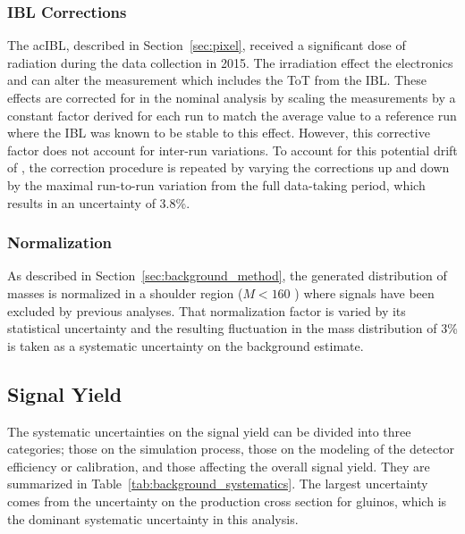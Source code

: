 \subsubsection{\ac{IBL} Corrections}

The ac{IBL}, described in Section~\ref{sec:pixel}, received a significant dose of radiation during the data collection in 2015.
The irradiation effect the electronics and can alter the \dedx measurement which includes the \ac{ToT} from the \ac{IBL}.
These effects are corrected for in the nominal analysis by scaling the \dedx measurements by a constant factor derived for each run to match the average \dedx value to a reference run where the \ac{IBL} was known to be stable to this effect.
However, this corrective factor does not account for inter-run variations.
To account for this potential drift of \dedx, the correction procedure is repeated by varying the corrections up and down by the maximal run-to-run variation from the full data-taking period, which results in an uncertainty of 3.8\%.

\subsubsection{Normalization}

As described in Section~\ref{sec:background_method}, the generated distribution of masses is normalized in a shoulder region ($M < 160$ \GeV) where signals have been excluded by previous analyses.
That normalization factor is varied by its statistical uncertainty and the resulting fluctuation in the mass distribution of 3\% is taken as a systematic uncertainty on the background estimate.

\subsection{Signal Yield}

The systematic uncertainties on the signal yield can be divided into three categories; those on the simulation process, those on the modeling of the detector efficiency or calibration, and those affecting the overall signal yield.
They are summarized in Table~\ref{tab:background_systematics}.
The largest uncertainty comes from the uncertainty on the production cross section for gluinos, which is the dominant systematic uncertainty in this analysis.

